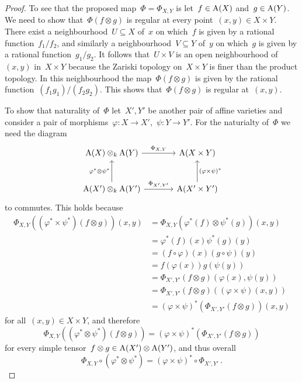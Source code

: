 \begin{proof}
  To see that the proposed map~$\Phi = \Phi_{X,Y}$ is  let~$f \in \operatorname{A}(X)$ and~$g \in \operatorname{A}(Y)$.
  We need to show that~$\Phi(f \otimes g)$ is regular at every point~$(x,y) \in X \times Y$.
  There exist a neighbourhood~$U \subseteq X$ of~$x$ on which~$f$ is given by a rational function~$f_1/f_2$, and similarly a neighbourhood~$V \subseteq Y$ of~$y$ on which~$g$ is given by a rational function~$g_1/g_2$.
  It follows that~$U \times V$ is an open neighbourhood of~$(x,y)$ in~$X \times Y$ because the Zariski topology on~$X \times Y$ is finer than the product topology.
  In this neighbourhood the map~$\Phi(f \otimes g)$ is given by the rational function~$(f_1 g_1) / (f_2 g_2)$.
  This shows that~$\Phi(f \otimes g)$ is regular at~$(x,y)$.
  
  To show that naturality of~$\Phi$ let~$X', Y'$ be another pair of affine varieties and consider a pair of morphisms~$\varphi \colon X \to X'$,~$\psi \colon Y \to Y'$.
  For the naturialty of~$\Phi$ we need the diagram
  \begin{equation}
  \label{naturality for product of coordinate rings}
    \begin{tikzcd}[sep = large]
        \coord(X) \otimes_k \coord(Y)
        \arrow{r}[above]{\Phi_{X,Y}}
      & \coord(X \times Y)
      \\
        \coord(X') \otimes_k \coord(Y')
        \arrow{u}[left]{\varphi^* \otimes \psi^*}
        \arrow{r}[above]{\Phi_{X',Y'}}
      & \coord(X' \times Y')
        \arrow{u}[right]{(\varphi \times \psi)^*}
    \end{tikzcd}
  \end{equation}
  to commutes.
  This holds because
  \begin{align*}
        \Phi_{X,Y}( (\varphi^* \times \psi^*)(f \otimes g) )(x,y)
    &=  \Phi_{X,Y}( \varphi^*(f) \otimes \psi^*(g) )(x,y)         \\
    &=  \varphi^*(f)(x) \psi^*(g)(y)                              \\
    &=  (f \circ \varphi)(x) (g \circ \psi)(y)                    \\
    &=  f(\varphi(x)) g(\psi(y))                                  \\
    &=  \Phi_{X',Y'}(f \otimes g)(\varphi(x), \psi(y))            \\
    &=  \Phi_{X',Y'}(f \otimes g)( (\varphi \times \psi)(x,y) )   \\
    &=  (\varphi \times \psi)^*( \Phi_{X',Y'}(f \otimes g) )(x,y)
  \end{align*}
  for all~$(x,y) \in X \times Y$, and therefore
  \[
      \Phi_{X,Y}( (\varphi^* \otimes \psi^*)(f \otimes g) )
    = (\varphi \times \psi)^*( \Phi_{X',Y'}(f \otimes g ) )
  \]
  for every simple tensor~$f \otimes g \in \operatorname{A}(X') \otimes \operatorname{A}(Y')$, and thus overall
  \[
      \Phi_{X,Y} \circ (\varphi^* \otimes \psi^*)
    = (\varphi \times \psi)^* \circ \Phi_{X',Y'} \,.
  \]


\end{proof}
